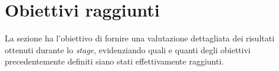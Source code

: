 \section{Obiettivi raggiunti}
La sezione ha l'obiettivo di fornire una valutazione dettagliata dei risultati ottenuti durante lo \textit{stage}, evidenziando quali e quanti degli obiettivi precedentemente definiti siano stati effettivamente raggiunti.